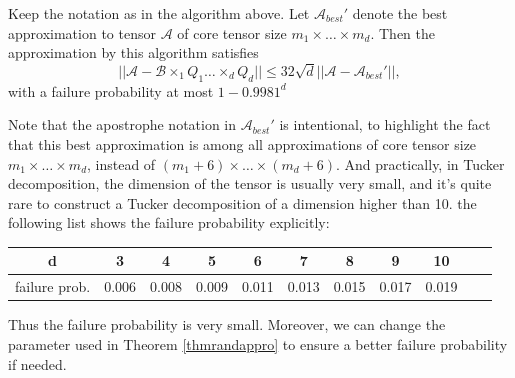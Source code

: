 \documentclass[12pt]{article}
\begin{document}
\begin{mythm}
Keep the notation as in the algorithm above. Let $\mathcal{A}_{best}'$ denote the best approximation to tensor $\mathcal{A}$ of core tensor size $m_1 \times \dots \times m_d$. 
Then the approximation by this algorithm satisfies
$$ || \mathcal{A} - \mathcal{B} \times_1 Q_1 \dots \times_d Q_d || \leq 32 \sqrt{d} || \mathcal{A} -\mathcal{A}_{best}' ||, $$
with a failure probability at most $1 - 0.9981 ^ d$
\end{mythm}

Note that the apostrophe notation in $\mathcal{A}_{best}'$ is intentional, to highlight the fact that this best approximation is among all approximations of core tensor size $m_1 \times \dots \times m_d$, instead of $(m_1 + 6) \times \dots \times (m_d + 6)$. And practically, in Tucker decomposition, the dimension of the tensor is usually very small, and it's quite rare to construct a Tucker decomposition of a dimension higher than 10. the following list shows the failure probability explicitly:

\begin{center}
	\begin{tabular}{ | c | c | c | c | c | c | c | c | c | c | c |  }
\hline
d   & 3   & 4  & 5  & 6   & 7   & 8   & 9   & 10 \\ \hline
failure prob.   & 0.006   & 0.008   & 0.009   & 0.011   & 0.013   & 0.015   & 0.017   & 0.019\\ \hline
	\end{tabular}
\end{center}

Thus the failure probability is very small. Moreover, we can change the parameter used in Theorem \ref{thmrandappro} to ensure a better failure probability if needed.
\end{document}
